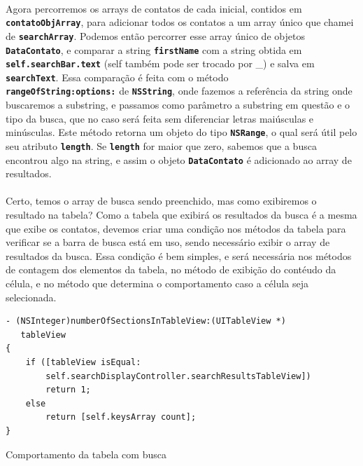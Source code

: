 \documentclass[a4paper,12pt,brazil,doubleside]{book}
\begin{document}
\begin{singlespace}
\paragraph{}Agora percorremos os arrays de contatos de cada inicial, contidos em \texttt{\textbf{contatoObjArray}}, para adicionar todos os contatos a um array único que chamei de \texttt{\textbf{searchArray}}. Podemos então percorrer esse array único de objetos \texttt{\textbf{DataContato}}, e comparar a string \texttt{\textbf{firstName}} com a string obtida em \texttt{\textbf{self.searchBar.text}} (self também pode ser trocado por \_) e salva em \texttt{\textbf{searchText}}. Essa comparação é feita com o método\\
\texttt{\textbf{rangeOfString:options:}} de \texttt{\textbf{NSString}}, onde fazemos a referência da string onde buscaremos a substring, e passamos como parâmetro a substring em questão e o tipo da busca, que no caso será feita sem diferenciar letras maiúsculas e minúsculas. Este método retorna um objeto do tipo \texttt{\textbf{NSRange}}, o qual será útil pelo seu atributo \texttt{\textbf{length}}. Se \texttt{\textbf{length}} for maior que zero, sabemos que a busca encontrou algo na string, e assim o objeto \texttt{\textbf{DataContato}} é adicionado ao array de resultados.
\paragraph{}Certo, temos o array de busca sendo preenchido, mas como exibiremos o resultado na tabela? Como a tabela que exibirá os resultados da busca é a mesma que exibe os contatos, devemos criar uma condição nos métodos da tabela para verificar se a barra de busca está em uso, sendo necessário exibir o array de resultados da busca. Essa condição é bem simples, e será necessária nos métodos de contagem dos elementos da tabela, no método de exibição do contéudo da célula, e no método que determina o comportamento caso a célula seja selecionada.

\begin{listing}[H]
\begin{verbatim}
- (NSInteger)numberOfSectionsInTableView:(UITableView *)
   tableView
{
    if ([tableView isEqual:
        self.searchDisplayController.searchResultsTableView])
        return 1;
    else
        return [self.keysArray count];
}
\end{verbatim}
\caption{Comportamento da tabela com busca}
\end{listing}


\end{singlespace}
\end{document}
